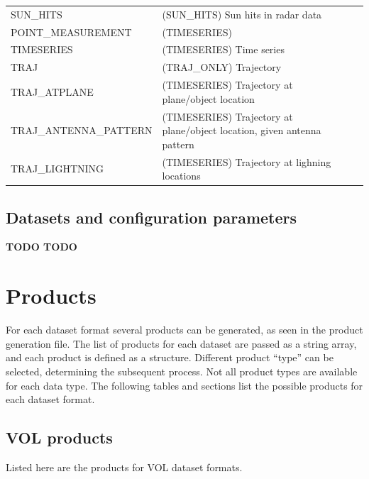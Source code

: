 \documentclass[a4paper,11pt,pdftex,twoside]{scrartcl}
\renewcommand{\bf}{\normalfont \bfseries}
\begin{document}
{{{\begin{longtable}{p{}p{}p{}}
SUN\_HITS & (SUN\_HITS) Sun hits in radar data & \\
POINT\_MEASUREMENT & (TIMESERIES) & \\
TIMESERIES & (TIMESERIES) Time series & \\
TRAJ & (TRAJ\_ONLY) Trajectory & \\
TRAJ\_ATPLANE & (TIMESERIES) Trajectory at plane/object location & \\
TRAJ\_ANTENNA\_PATTERN & (TIMESERIES) Trajectory at plane/object location, given antenna pattern & \\
TRAJ\_LIGHTNING & (TIMESERIES) Trajectory at lighning locations & \\

\end{longtable}



\subsection{Datasets and configuration parameters}

{\bf TODO TODO}






\newpage

\section{Products}
\label{sub_products}

For each dataset format several products can be generated, as seen in the product generation file.
The list of products for each dataset are passed as a string array, and each product is defined as a structure.
Different product ``type'' can be selected, determining the subsequent process.
Not all product types are available for each data type.
The following tables and sections list the possible products for each dataset format.


\subsection{VOL products}
Listed here are the products for VOL dataset formats.

}}}
\end{document}
